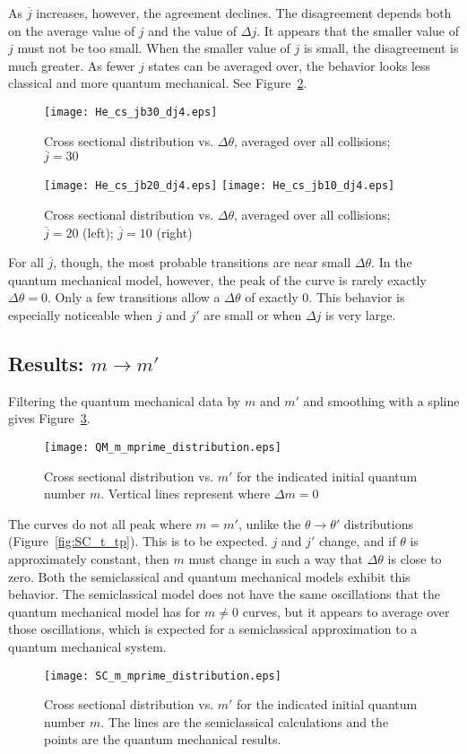 \documentclass[letterpaper,11pt]{article}
\begin{document}
As $\overline j$ increases, however, the agreement declines. The disagreement
depends both on the average value of $j$ and the value of $\Delta j$. It
appears that the smaller value of $j$ must not be too small.  When the smaller
value of $j$ is small, the disagreement is much greater.  As fewer $j$ states
can be averaged over, the behavior looks less classical and more quantum
mechanical.  See Figure~\ref{fig:He_cs_jb20_10}.
\begin{figure}[ht!]
    \centering
    \texttt{[image: He\_cs\_jb30\_dj4.eps]}
    \caption{Cross sectional distribution vs. $\Delta\theta$, averaged over all collisions; $\overline j=30$}
\label{fig:He_cs_jb30}
\end{figure}
\begin{figure}[ht!]
    \centering
    \texttt{[image: He\_cs\_jb20\_dj4.eps]}
    \texttt{[image: He\_cs\_jb10\_dj4.eps]}
    \caption{Cross sectional distribution vs. $\Delta\theta$, averaged over all collisions; $\overline j = 20$ (left); $\overline j = 10$ (right)}
\label{fig:He_cs_jb20_10}
\end{figure}
For all $\overline j$, though, the most probable transitions are near small
$\Delta\theta$.  In the quantum mechanical model, however, the peak of the curve is rarely exactly
$\Delta\theta=0$.  Only a few transitions allow a $\Delta\theta$ of exactly 0.
This behavior is especially noticeable when $j$ and $j'$ are small or when
$\Delta j$ is very large.

\subsection{Results: $m\rightarrow m'$}
Filtering the quantum mechanical data by $m$ and $m'$ and smoothing with a spline gives
Figure~\ref{fig:He_cs_m_mp}.
\begin{figure}[ht!]
    \centering
    \texttt{[image: QM\_m\_mprime\_distribution.eps]}
    \caption{Cross sectional distribution vs. $m'$ for the indicated initial quantum number $m$. Vertical lines represent where $\Delta m=0$} 
\label{fig:He_cs_m_mp}
\end{figure}
The curves do not all peak where $m=m'$, unlike
the $\theta\rightarrow\theta'$ distributions (Figure~\ref{fig:SC_t_tp}).  This
is to be expected.  $j$ and $j'$ change, and if $\theta$ is approximately
constant, then $m$ must change in such a way that $\Delta\theta$ is close to
zero.  Both the semiclassical and quantum mechanical models exhibit this behavior.  The semiclassical model does not
have the same oscillations that the quantum mechanical model has for $m\neq0$ curves, but it
appears to average over those oscillations, which is expected for a
semiclassical approximation to a quantum mechanical system.
\begin{figure}[ht!]
    \centering
    \texttt{[image: SC\_m\_mprime\_distribution.eps]}
    \caption{Cross sectional distribution vs. $m'$ for the indicated initial quantum number $m$. The lines are the semiclassical calculations and the points are the quantum mechanical results.}
\label{fig:He_cs_m_mp_comp}
\end{figure}
\end{document}
